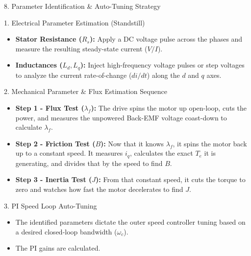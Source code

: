 \documentclass[aspectratio=169]{beamer}
\begin{document}
\begin{frame}{8. Parameter Identification \& Auto-Tuning Strategy}
    \footnotesize
    \begin{block}{1. Electrical Parameter Estimation (Standstill)}
        \begin{itemize}
            \item \textbf{Stator Resistance ($R_s$):} Apply a DC voltage pulse across the phases and measure the resulting steady-state current ($V/I$).
            \item \textbf{Inductances ($L_d, L_q$):} Inject high-frequency voltage pulses or step voltages to analyze the current rate-of-change ($di/dt$) along the $d$ and $q$ axes.
        \end{itemize}
    \end{block}
    
    \vspace{-1.5mm}
    \begin{block}{2. Mechanical Parameter \& Flux Estimation Sequence}
        \begin{itemize}
            \item \textbf{Step 1 - Flux Test ($\lambda_f$):} The drive spins the motor up open-loop, cuts the power, and measures the unpowered Back-EMF voltage coast-down to calculate $\lambda_f$.
            \item \textbf{Step 2 - Friction Test ($B$):} Now that it knows $\lambda_f$, it spins the motor back up to a constant speed. It measures $i_q$, calculates the exact $T_e$ it is generating, and divides that by the speed to find $B$.
            \item \textbf{Step 3 - Inertia Test ($J$):} From that constant speed, it cuts the torque to zero and watches how fast the motor decelerates to find $J$.
        \end{itemize}
    \end{block}

    \vspace{-1.5mm}
    \begin{block}{3. PI Speed Loop Auto-Tuning}
        \begin{itemize}
            \item The identified parameters dictate the outer speed controller tuning based on a desired closed-loop bandwidth ($\omega_c$).
            \item The PI gains are calculated.
        \end{itemize}
    \end{block}
\end{frame}
\end{document}
